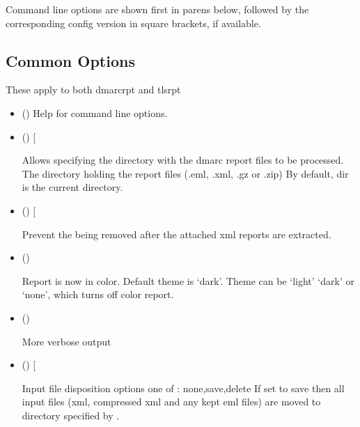 \documentclass[letterpaper,10pt,english]{sphinxmanual}
\begin{document}
\sphinxAtStartPar
Command line options are shown first in parens below, followed by
the corresponding config version in square brackets, if available.


\subsection{Common Options}
\label{\detokenize{README:common-options}}
\sphinxAtStartPar
These apply to both dmarc\sphinxhyphen{}rpt and tls\sphinxhyphen{}rpt
\begin{itemize}
\item {} 
\sphinxAtStartPar
()
Help for command line options.

\item {} 
\sphinxAtStartPar
() {[}\sphinxstyleemphasis{dir = /path/xxx/}{]}

\sphinxAtStartPar
Allows specifying the directory with the dmarc report files to be processed.
The directory holding the report files (.eml, .xml, .gz or .zip)
By default, dir is the current directory.

\item {} 
\sphinxAtStartPar
()  {[}\sphinxstyleemphasis{keep = true}{]}

\sphinxAtStartPar
Prevent the  being removed after the attached xml reports are extracted.

\item {} 
\sphinxAtStartPar
()

\sphinxAtStartPar
Report is now in color.
Default theme is ‘dark’. Theme can be ‘light’ ‘dark’ or ‘none’, which turns off color report.

\item {} 
\sphinxAtStartPar
()

\sphinxAtStartPar
More verbose output

\item {} 
\sphinxAtStartPar
()  {[}\sphinxstyleemphasis{inp\_file\_disp = save}{]}

\sphinxAtStartPar
Input file disposition options one of : none,save,delete
If set to save then all input files (xml, compressed xml and any kept eml files) are moved
to directory specified by .


\end{itemize}
\end{document}
